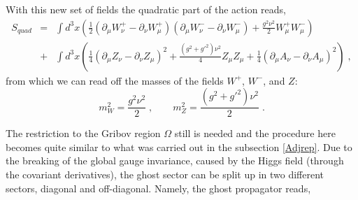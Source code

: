 With this new set of fields the quadratic part of the action reads,
\begin{eqnarray}
S_{quad} &=&  \int d^3 x   \left( \frac{1}{2} (\partial_\mu W^+_\nu - \partial_\nu W^+_\mu)(\partial_\mu W^-_\nu - \partial_\nu W^-_\mu)  + \frac{g^2\nu^2}{2}W^+_\mu W^-_\mu   \right) 
\nonumber \\
&+& \int d^3x  \left(  \frac{1}{4} (\partial_\mu Z_\nu - \partial_\nu Z_\mu)^2  + \frac{(g^2+g'^2)\nu^2}{4}Z_\mu Z _\mu  +    \frac{1}{4} (\partial_\mu A_\nu - \partial_\nu A_\mu)^2  \right)  \;,
\label{qd}
\end{eqnarray}
from which we can read off the masses of the fields $W^+$, $W^-$, and $Z$:
\begin{equation}
m^2_W = \frac{g^2\nu^2}{2} \;, \qquad m^2_Z =  \frac{(g^2+g'^2)\nu^2}{2}  \;. \label{ms}
\end{equation}

The restriction to the Gribov region $\Omega$ still is needed and the procedure here becomes quite similar to what was carried out in the subsection \ref{Adjrep}. Due to the breaking of the global gauge invariance, caused by the Higgs field (through the covariant derivatives), the ghost sector can be split up in two different sectors, diagonal and off-diagonal. Namely, the ghost propagator reads,




